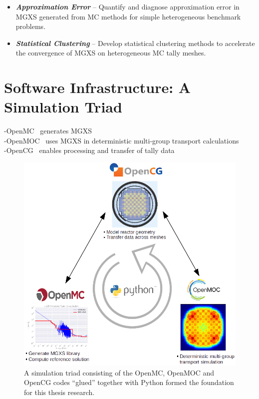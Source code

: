 \documentclass[12pt,twoside]{mitthesis-exec}
\begin{document}
\begin{itemize}
\item \textbf{\textit{Approximation Error}} -- Quantify and diagnose approximation error in MGXS generated from MC methods for simple heterogeneous benchmark problems.
\item \textbf{\textit{Statistical Clustering}} -- Develop statistical clustering methods to accelerate the convergence of MGXS on heterogeneous MC tally meshes.
\end{itemize}

\clearpage

\section*{Software Infrastructure: A Simulation Triad}

-OpenMC~\cite{romano2013openmc} generates MGXS \\
-OpenMOC~\cite{boyd2014openmoc} uses MGXS in deterministic multi-group transport calculations \\
-OpenCG~\cite{boyd2015opencg} enables processing and transfer of tally data  \\

\begin{figure}[h!]
  \centering
  \includegraphics[width=\linewidth]{figures/workflow/triad/simulation-triad}
\caption[A simulation triad of OpenMC, OpenMOC and OpenCG]{A simulation triad consisting of the OpenMC, OpenMOC and OpenCG codes ``glued'' together with Python formed the foundation for this thesis research.}
\label{fig:simulation-triad}
\end{figure}
\end{document}
